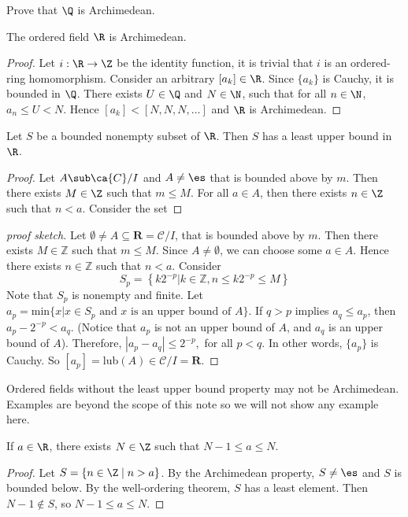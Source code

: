 \documentclass[10pt]{article}
\begin{document}
\begin{problem}
    Prove that $\Q$ is Archimedean.
\end{problem}
\begin{proposition}
    The ordered field $\R$ is Archimedean.
\end{proposition}
\begin{proof}
    Let $i:\R\to\Z$ be the identity function, it is trivial that $i$ is an ordered-ring homomorphism. Consider an arbitrary $[{a}_{k}]\in\R$. Since $\{{a}_{k}\}$ is Cauchy, it is bounded in $\Q$. There exists $U\in\Q$ and $N\in\N$, such that for all $n\in\N$, ${a}_{n}\le U<N$. Hence $[{a}_{k}]<[N,N,N,\dots]$ and $\R$ is Archimedean.
\end{proof}
\begin{proposition}
    Let $S$ be a bounded nonempty subset of $\R$. Then $S$ has a least upper bound in $\R$.
\end{proposition}
\begin{proof}
    Let $A\sub\ca{C}/I$ and $A\ne\es$ that is bounded above by $m$. Then there exists $M\in\Z$ such that $m\le M$. For all $a\in A$, then there exists $n\in\Z$ such that $n<a$. Consider the set 
\end{proof}
\begin{proof}[proof sketch]
    Let $\emptyset\neq A\subseteq\mathbf{R}=\mathcal{C}/{I}$, that is bounded above by $m$. Then there exists $ M\in\mathbb{Z}$ such that $m\leq M$. Since $A\neq\emptyset$, we can choose some $a\in A$. Hence there exists $ n\in\mathbb{Z}$ such that $n<a$. Consider 
    $$
        S_p=\left\{k2^{-p}\big|k\in\mathbb{Z},n\leq k2^{-p}\leq M\right\}
    $$
    Note that $S_p$ is nonempty and finite. Let $a_p=\text{min}\{x|x\in S_p \text{ and } x\text{ is an upper bound of } A\}$. If $q>p$ implies $a_q\leq a_p$, then $a_p-2^{-p}<a_q$. (Notice that $a_p$ is not an upper bound of $A$, and $a_q$ is an upper bound of $A$). Therefore, $|a_p-a_q|\leq 2^{-p}$,\ for all $p<q$. In other words, $\{a_p\}$ is Cauchy. So $[a_p]=$lub$(A)\in\mathcal{C}/{I}=\mathbf{R}$.
\end{proof}
\par    
Ordered fields without the least upper bound property may not be Archimedean. Examples are beyond the scope of this note so we will not show any example here.
\begin{proposition}
    If $a\in\R$, there exists $N\in\Z$ such that $N-1\leq a\leq N$.
\end{proposition}
\begin{proof}
    Let $S=\{n\in\Z\mid n>a\}$. By the Archimedean property, $S\ne\es$ and $S$ is bounded below. By the well-ordering theorem, $S$ has a least element. Then $N-1\notin S$, so $N-1\le a\le N$.
\end{proof}
\end{document}

